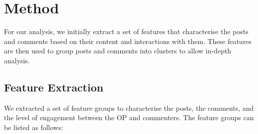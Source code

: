 


\section{Method}

For our analysis, we initially extract a set of features that characterise the posts and comments based on their content and interactions with them. These features are then used to group posts and comments into clusters to allow in-depth analysis.

\subsection{Feature Extraction}

We extracted a set of feature groups to characterise the posts, the comments, and the level of engagement between the OP and commenters. The feature groups can be listed as follows:


